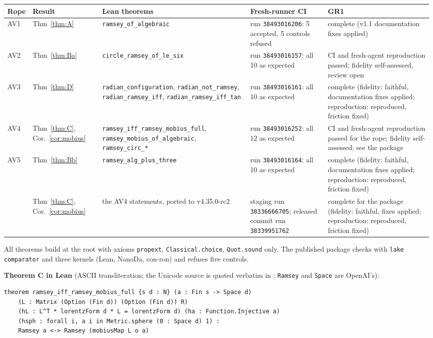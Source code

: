 \documentclass[11pt]{amsart}
\theoremstyle{plain}
\theoremstyle{definition}
\begin{document}
\medskip
{\small\noindent\begin{tabular}{@{}p{}p{}p{}p{}p{}@{}}
\toprule
Rope & Result & Lean theorems & Fresh-runner CI & GR1 \\
\midrule
AV1 & Thm~\ref{thm:A} & \texttt{ramsey\_of\_algebraic} & run \texttt{38493016206}: 5 accepted, 5 controls
refused & complete (v1.1 documentation fixes applied) \\
AV2 & Thm~\ref{thm:Ba} & \texttt{circle\_ramsey\_of\_le\_six} & run \texttt{38493016157}: all 10 as expected &
CI and fresh-agent reproduction passed; fidelity self-assessed, review open \\
AV3 & Thm~\ref{thm:D} & \texttt{radian\_configuration}, \texttt{radian\_not\_ramsey},
\texttt{radian\_ramsey\_iff}, \texttt{radian\_ramsey\_iff\_tan} & run \texttt{38493016161}: all 10 as expected &
complete (fidelity: faithful, documentation fixes applied; reproduction: reproduced, friction fixed) \\
AV4 & Thm~\ref{thm:C}, Cor.~\ref{cor:mobius} & \texttt{ramsey\_\allowbreak{}iff\_\allowbreak{}ramsey\_\allowbreak{}mobius\_\allowbreak{}full},
\texttt{ramsey\_\allowbreak{}mobius\_\allowbreak{}of\_\allowbreak{}algebraic}, \texttt{ramsey\_\allowbreak{}circ\_\allowbreak{}*} & run \texttt{38493016252}: all 12 as expected
& CI and fresh-agent reproduction passed for the rope; fidelity self-assessed; see the package \\
AV5 & Thm~\ref{thm:Bb} & \texttt{ramsey\_alg\_plus\_three} & run \texttt{38493016164}: all 10 as expected &
complete (fidelity: faithful, documentation fixes applied; reproduction: reproduced, friction fixed) \\
\cite{MR} & Thm~\ref{thm:C}, Cor.~\ref{cor:mobius} & the AV4 statements, ported to v4.35.0-rc2 & staging run
\texttt{38336666705}; released commit run \texttt{38339951762} & complete for the package (fidelity: faithful,
fixes applied; reproduction: reproduced, friction fixed) \\
\bottomrule
\end{tabular}}

\medskip\noindent All theorems build at the root with axioms \texttt{propext}, \texttt{Classical.choice},
\texttt{Quot.sound} only. The published package \cite{MR} checks with \texttt{lake comparator} and three
kernels (Lean, NanoDa, con-ron) and refuses five controls.

\noindent\textbf{Theorem C in Lean} (ASCII transliteration; the Unicode source is quoted verbatim in
\cite[\S3]{MR}; \texttt{Ramsey} and \texttt{Space} are OpenAI's):
\begin{verbatim}
theorem ramsey_iff_ramsey_mobius_full {s d : N} (a : Fin s -> Space d)
    (L : Matrix (Option (Fin d)) (Option (Fin d)) R)
    (hL : L^T * lorentzForm d * L = lorentzForm d) (ha : Function.Injective a)
    (hsph : forall i, a i in Metric.sphere (0 : Space d) 1) :
    Ramsey a <-> Ramsey (mobiusMap L o a)
\end{verbatim}
\end{document}
